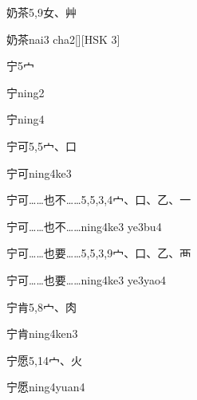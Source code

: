 \begin{entry}{奶茶}{5,9}{⼥、⾋}
  \begin{phonetics}{奶茶}{nai3 cha2}[][HSK 3]
  \end{phonetics}
\end{entry}

\begin{entry}{宁}{5}{⼧}
  \begin{phonetics}{宁}{ning2}
  \end{phonetics}
  \begin{phonetics}{宁}{ning4}
  \end{phonetics}
\end{entry}

\begin{entry}{宁可}{5,5}{⼧、⼝}
  \begin{phonetics}{宁可}{ning4ke3}
  \end{phonetics}
\end{entry}

\begin{entry}{宁可……也不……}{5,5,3,4}{⼧、⼝、⼄、⼀}
  \begin{phonetics}{宁可……也不……}{ning4ke3 ye3bu4}
  \end{phonetics}
\end{entry}

\begin{entry}{宁可……也要……}{5,5,3,9}{⼧、⼝、⼄、⾑}
  \begin{phonetics}{宁可……也要……}{ning4ke3 ye3yao4}
  \end{phonetics}
\end{entry}

\begin{entry}{宁肯}{5,8}{⼧、⾁}
  \begin{phonetics}{宁肯}{ning4ken3}
  \end{phonetics}
\end{entry}

\begin{entry}{宁愿}{5,14}{⼧、⽕}
  \begin{phonetics}{宁愿}{ning4yuan4}
  \end{phonetics}
\end{entry}

